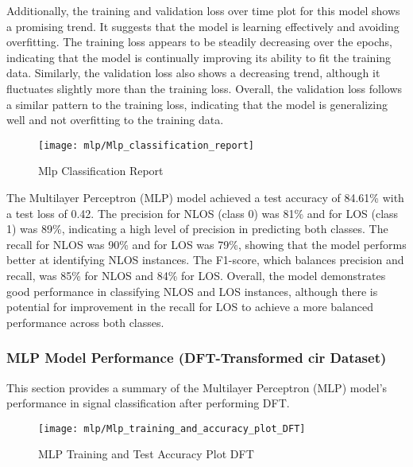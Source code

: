 Additionally, the training and validation loss over time plot for this model shows a promising trend. It suggests that the model is learning effectively and avoiding overfitting. The training loss appears to be steadily decreasing over the epochs, indicating that the model is continually improving its ability to fit the training data. Similarly, the validation loss also shows a decreasing trend, although it fluctuates slightly more than the training loss. Overall, the validation loss follows a similar pattern to the training loss, indicating that the model is generalizing well and not overfitting to the training data.

\begin{figure}[H] 
	\centering
	\texttt{[image: mlp/Mlp\_classification\_report]}
	\caption{Mlp Classification Report}\label{fig:mlp_classification_report}
\end{figure}

The Multilayer Perceptron (MLP) model achieved a test accuracy of 84.61\% with a test loss of 0.42. The precision for NLOS (class 0) was 81\% and for LOS (class 1) was 89\%, indicating a high level of precision in predicting both classes. The recall for NLOS was 90\% and for LOS was 79\%, showing that the model performs better at identifying NLOS instances. The F1-score, which balances precision and recall, was 85\% for NLOS and 84\% for LOS. Overall, the model demonstrates good performance in classifying NLOS and LOS instances, although there is potential for improvement in the recall for LOS to achieve a more balanced performance across both classes.

\subsubsection{MLP Model Performance (DFT-Transformed \gls{cir} Dataset)}

This section provides a summary of the Multilayer Perceptron (MLP) model's performance in signal classification after performing DFT.

\begin{figure}[H] 
	\centering
	\texttt{[image: mlp/Mlp\_training\_and\_accuracy\_plot\_DFT]}
	\caption{MLP Training and Test Accuracy Plot DFT}\label{fig:Mlp_training_and_accuracy_plot_DFT}
\end{figure}

